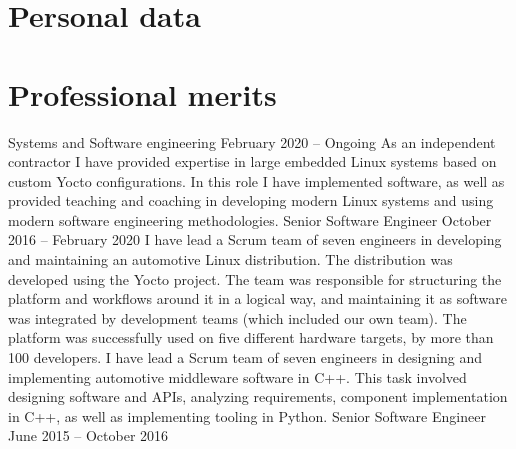 \documentclass{twocolcv}
\begin{document}
\section*{Personal data}
\section*{Professional merits}
           {Systems and Software engineering}
           {February 2020 -- Ongoing}
           {
        {As an independent contractor I have provided expertise in large embedded Linux systems based on custom Yocto configurations. In this role I have implemented software, as well as provided teaching and coaching in developing modern Linux systems and using modern software engineering methodologies.}
}
           {Senior Software Engineer}
           {October 2016 -- February 2020}
           {
        {I have lead a Scrum team of seven engineers in developing and maintaining an automotive Linux distribution. The distribution was developed using the Yocto project. The team was responsible for structuring the platform and workflows around it in a logical way, and maintaining it as software was integrated by development teams (which included our own team). The platform was successfully used on five different hardware targets, by more than 100 developers.}
\newline\newline
{}
        {I have lead a Scrum team of seven engineers in designing and implementing automotive middleware software in C++. This task involved designing software and APIs, analyzing requirements, component implementation in C++, as well as implementing tooling in Python.
}
}
           {Senior Software Engineer}
           {June 2015 -- October 2016}
\end{document}
